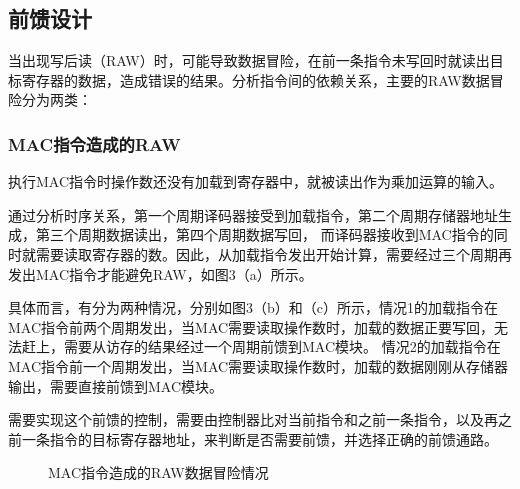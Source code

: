\documentclass[UTF8]{ctexart}
\begin{document}
\subsection{前馈设计}
当出现写后读（RAW）时，可能导致数据冒险，在前一条指令未写回时就读出目标寄存器的数据，造成错误的结果。分析指令间的依赖关系，主要的RAW数据冒险分为两类：

\subsubsection{MAC指令造成的RAW}
执行MAC指令时操作数还没有加载到寄存器中，就被读出作为乘加运算的输入。

通过分析时序关系，第一个周期译码器接受到加载指令，第二个周期存储器地址生成，第三个周期数据读出，第四个周期数据写回，
而译码器接收到MAC指令的同时就需要读取寄存器的数。因此，从加载指令发出开始计算，需要经过三个周期再发出MAC指令才能避免RAW，如图3（a）所示。

具体而言，有分为两种情况，分别如图3（b）和（c）所示，情况1的加载指令在MAC指令前两个周期发出，当MAC需要读取操作数时，加载的数据正要写回，无法赶上，需要从访存的结果经过一个周期前馈到MAC模块。
情况2的加载指令在MAC指令前一个周期发出，当MAC需要读取操作数时，加载的数据刚刚从存储器输出，需要直接前馈到MAC模块。

需要实现这个前馈的控制，需要由控制器比对当前指令和之前一条指令，以及再之前一条指令的目标寄存器地址，来判断是否需要前馈，并选择正确的前馈通路。

\begin{figure}[htbp]
    \centering
    \caption{MAC指令造成的RAW数据冒险情况}
    \label{Fig.main}
\end{figure}
\end{document}
